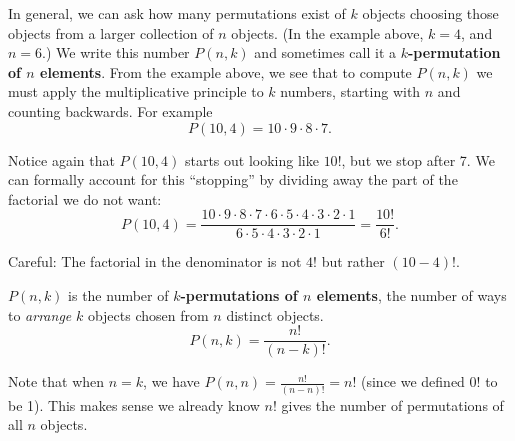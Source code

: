 \documentclass[11pt,]{book}
\newcommand{\terminology}[1]{\textbf{#1}}
\theoremstyle{ptxplainnotitle}
\theoremstyle{ptxplaintitle}
\theoremstyle{ptxdefinitionnotitle}
\theoremstyle{ptxdefinitiontitle}
\theoremstyle{ptxdefinitionnotitle}
\theoremstyle{ptxdefinitiontitle}
\theoremstyle{ptxdefinitionnotitle}
\theoremstyle{ptxdefinitiontitle}
\theoremstyle{ptxdefinitiontitlenonumber}
\theoremstyle{ptxdefinitiontitlenonumber}
\numberwithin{equation}{chapter}
\begin{document}
\hypertarget{p-1428}{}%
In general, we can ask how many permutations exist of \(k\) objects choosing those objects from a larger collection of \(n\) objects. (In the example above, \(k = 4\), and \(n = 6\).) We write this number \(P(n,k)\) and sometimes call it a \terminology{\(k\)-permutation of \(n\) elements}. From the example above, we see that to compute \(P(n,k)\) we must apply the multiplicative principle to \(k\) numbers, starting with \(n\) and counting backwards. For example%
\begin{equation*}
P(10, 4) = 10\cdot 9 \cdot 8 \cdot 7.
\end{equation*}
%
\par
\hypertarget{p-1429}{}%
Notice again that \(P(10,4)\) starts out looking like \(10!\), but we stop after 7. We can formally account for this ``stopping'' by dividing away the part of the factorial we do not want:%
\begin{equation*}
P(10,4) = \frac{10\cdot 9 \cdot 8 \cdot 7 \cdot 6 \cdot 5 \cdot 4 \cdot 3 \cdot 2 \cdot 1}{6 \cdot 5 \cdot 4 \cdot 3 \cdot 2 \cdot 1} = \frac{10!}{6!}.
\end{equation*}
%
\par
\hypertarget{p-1430}{}%
Careful: The factorial in the denominator is not \(4!\) but rather \((10-4)!\).%
\begin{assemblage}\label{assemblage-22}
\hypertarget{p-1431}{}%
 \(P(n,k)\) is the number of \terminology{\(k\)-permutations of \(n\) elements}, the number of ways to \emph{arrange} \(k\) objects chosen from \(n\) distinct objects.%
\begin{equation*}
P(n,k) = \frac{n!}{(n-k)!}.
\end{equation*}
%
\end{assemblage}
\hypertarget{p-1432}{}%
Note that when \(n = k\), we have \(P(n,n) = \frac{n!}{(n-n)!} = n!\) (since we defined \(0!\) to be 1). This makes sense \textemdash{}we already know \(n!\) gives the number of permutations of all \(n\) objects.%
\end{document}
